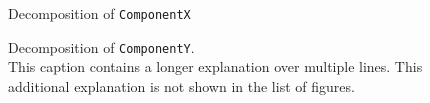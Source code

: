 
\showdecompnotes{}

\begin{figure}[!htp]
	\centering
	\caption{Decomposition of \texttt{ComponentX}}\label{fig:decomp-componentx}
\end{figure}

\begin{figure}[!htp]
	\centering
	\caption[Decomposition of \texttt{ComponentY}]{Decomposition of \texttt{ComponentY}.\\
	This caption contains a longer explanation over multiple lines. This additional explanation is not shown in the list of figures.}\label{fig:decomp-componenty}
\end{figure}
